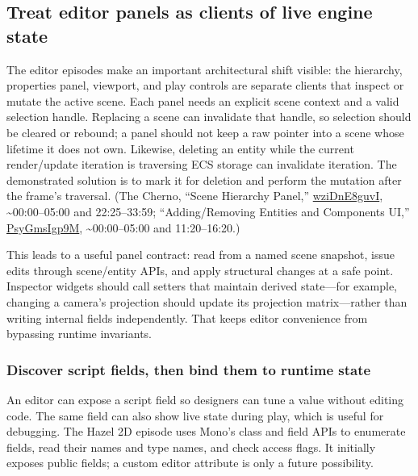 \subsection{Treat editor panels as clients of live engine state}\label{06-engine-ii-ch032-treat-editor-panels-as-clients-of-live-engine-state}

The editor episodes make an important architectural shift visible: the hierarchy, properties panel, viewport, and play controls are separate clients that inspect or mutate the active scene. Each panel needs an explicit scene context and a valid selection handle. Replacing a scene can invalidate that handle, so selection should be cleared or rebound; a panel should not keep a raw pointer into a scene whose lifetime it does not own. Likewise, deleting an entity while the current render/update iteration is traversing ECS storage can invalidate iteration. The demonstrated solution is to mark it for deletion and perform the mutation after the frame's traversal. (The Cherno, ``Scene Hierarchy Panel,'' \href{https://www.youtube.com/watch?v=wziDnE8guvI}{wziDnE8guvI}, \textasciitilde00:00--05:00 and 22:25--33:59; ``Adding/Removing Entities and Components UI,'' \href{https://www.youtube.com/watch?v=PsyGmsIgp9M}{PsyGmsIgp9M}, \textasciitilde00:00--05:00 and 11:20--16:20.)

This leads to a useful panel contract: read from a named scene snapshot, issue edits through scene/entity APIs, and apply structural changes at a safe point. Inspector widgets should call setters that maintain derived state---for example, changing a camera's projection should update its projection matrix---rather than writing internal fields independently. That keeps editor convenience from bypassing runtime invariants.

\subsubsection{Discover script fields, then bind them to runtime state}\label{06-engine-ii-ch032-discover-script-fields-then-bind-them-to-runtime-state}

An editor can expose a script field so designers can tune a value without editing code. The same field can also show live state during play, which is useful for debugging. The Hazel 2D episode uses Mono's class and field APIs to enumerate fields, read their names and type names, and check access flags. It initially exposes public fields; a custom editor attribute is only a future possibility.

